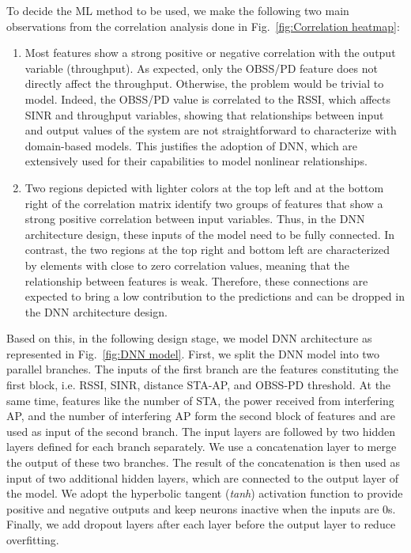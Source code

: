 \documentclass[10pt,a4paper,twocolumn]{article}
\newcommand{\ITUpar}{\vspace{8pt}\par}
\begin{document}
To decide the ML method to be used, we make the following two main observations from the correlation analysis done in Fig.~\ref{fig:Correlation heatmap}:
\begin{enumerate}
	\item Most features show a strong positive or negative correlation with the output variable (throughput). As expected, only the OBSS/PD feature does not directly affect the throughput. Otherwise, the problem would be trivial to model. Indeed, the OBSS/PD value is correlated to the RSSI, which affects SINR and throughput variables, showing that relationships between input and output values of the system are not straightforward to characterize with domain-based models. This justifies the adoption of DNN, which are extensively used for their capabilities to model nonlinear relationships. 
	\item Two regions depicted with lighter colors at the top left and at the bottom right of the correlation matrix identify two groups of features that show a strong positive correlation between input variables. Thus, in the DNN architecture design, these inputs of the model need to be fully connected. In contrast, the two regions at the top right and bottom left are characterized by elements with close to zero correlation values, meaning that the relationship between features is weak. Therefore, these connections are expected to bring a low contribution to the predictions and can be dropped in the DNN architecture design. 
\end{enumerate}

Based on this, in the following design stage, we model DNN architecture as represented in Fig.~\ref{fig:DNN model}. First, we split the DNN model into two parallel branches. The inputs of the first branch are the features constituting the first block, i.e. RSSI, SINR, distance STA-AP, and OBSS-PD threshold. At the same time, features like the number of STA, the power received from interfering AP, and the number of interfering AP form the second block of features and are used as input of the second branch. The input layers are followed by two hidden layers defined for each branch separately. We use a concatenation layer to merge the output of these two branches. The result of the concatenation is then used as input of two additional hidden layers, which are connected to the output layer of the model. We adopt the hyperbolic tangent (\emph{tanh}) activation function to provide positive and negative outputs and keep neurons inactive when the inputs are $0$s. Finally, we add dropout layers after each layer before the output layer to reduce overfitting.\ITUpar
\end{document}
